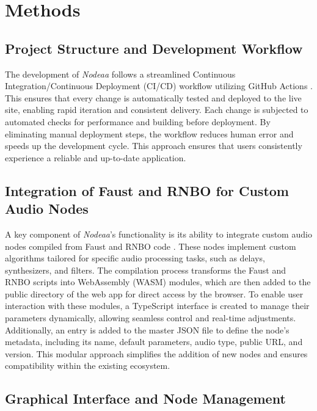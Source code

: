 \documentclass[10pt,twocolumn]{article}
\begin{document}
\section{Methods}

\subsection{Project Structure and Development Workflow}
The development of \textit{Nodeaa} follows a streamlined Continuous Integration/Continuous Deployment (CI/CD) workflow utilizing GitHub Actions \cite{chandrasekara2021introduction}. This ensures that every change is automatically tested and deployed to the live site, enabling rapid iteration and consistent delivery. Each change is subjected to automated checks for performance and building before deployment. By eliminating manual deployment steps, the workflow reduces human error and speeds up the development cycle. This approach ensures that users consistently experience a reliable and up-to-date application.

\subsection{Integration of Faust and RNBO for Custom Audio Nodes}
A key component of \textit{Nodeaa}'s functionality is its ability to integrate custom audio nodes compiled from Faust and RNBO code \cite{kilius2015web} \cite{letz2017compiling} \cite{letz2015faust}. These nodes implement custom algorithms tailored for specific audio processing tasks, such as delays, synthesizers, and filters. The compilation process transforms the Faust and RNBO scripts into WebAssembly (WASM) modules, which are then added to the public directory of the web app for direct access by the browser. To enable user interaction with these modules, a TypeScript interface is created to manage their parameters dynamically, allowing seamless control and real-time adjustments. Additionally, an entry is added to the master JSON file to define the node's metadata, including its name, default parameters, audio type, public URL, and version. This modular approach simplifies the addition of new nodes and ensures compatibility within the existing ecosystem.

\subsection{Graphical Interface and Node Management}
\end{document}

